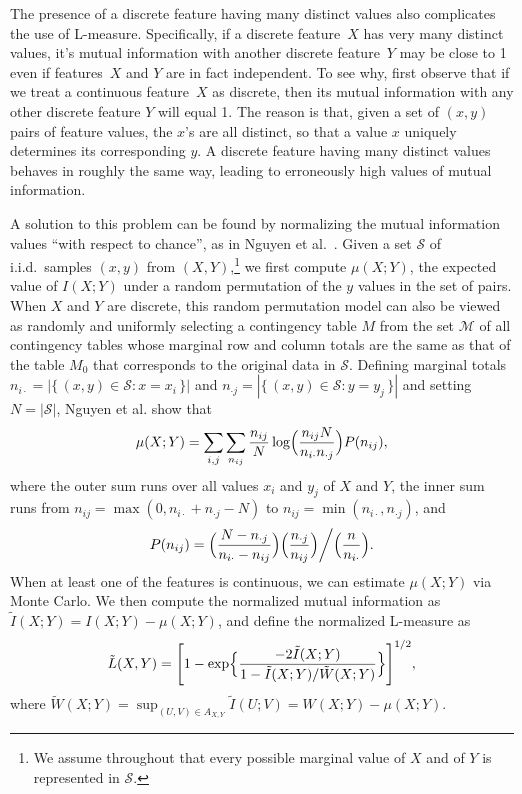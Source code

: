 \documentclass[11pt]{article}
\newcommand{\xM}{\mathcal{M}}
\newcommand{\xS}{\mathcal{S}}
\newcommand{\yI}{\tilde{I}}
\newcommand{\yL}{\tilde{L}}
\newcommand{\yW}{\tilde{W}}
\begin{document}
The presence of a discrete feature having many distinct values also complicates the use of L-measure. Specifically, if a discrete feature~$X$ has very many distinct values, it's mutual information with another discrete feature~$Y$ may be close to 1 even if features~$X$ and $Y$ are in fact independent. To see why, first observe that if we treat a continuous feature~$X$ as discrete, then its mutual information with any other discrete feature $Y$ will equal 1. The reason is that, given a set of $(x,y)$ pairs of feature values, the $x$'s are all distinct, so that a value $x$ uniquely determines its corresponding $y$. A discrete feature having many distinct values behaves in roughly the same way, leading to erroneously high values of mutual information.

A solution to this problem can be found by normalizing the mutual information values ``with respect to chance'', as in Nguyen et al.~\cite{NguyenEB09}. Given a set $\xS$ of i.i.d.\ samples $(x,y)$ from $(X,Y)$,\footnote{We assume throughout that every possible marginal value of $X$ and of $Y$ is represented in $\xS$.} we first compute $\mu(X;Y)$, the expected value of $I(X;Y)$ under a random permutation of the $y$ values in the set of pairs. When $X$ and $Y$ are discrete, this random permutation model can also be viewed as randomly and uniformly selecting a contingency table $M$ from the set $\xM$ of all contingency tables whose marginal row and column totals are the same as that of the table $M_0$ that corresponds to the original data in $\xS$. Defining marginal totals $n_{i\cdot}=|\{\,(x,y)\in\xS:x=x_i\,\}|$ and $n_{\cdot j}=|\{\,(x,y)\in\xS:y=y_j\,\}|$ and setting $N=|\xS|$, Nguyen et al. show that
\begin{equation}\label{eq:muxy}
\mu(X;Y)=\sum_{i,j}\sum_{n_{ij}}\frac{n_{ij}}{N}\log\Bigl(\frac{n_{ij}N}{n_{i\cdot}n_{\cdot j}}\Bigr)P(n_{ij}),
\end{equation}
where the outer sum runs over all values $x_i$ and $y_j$ of $X$ and $Y$, the inner sum runs from $n_{ij}=\max(0,n_{i\cdot}+n_{\cdot j}-N)$ to $n_{ij}=\min(n_{i\cdot},n_{\cdot j})$, and
\[
P(n_{ij})=\Bigl(\frac{N-n_{\cdot j}}{n_{i\cdot}-n_{ij}}\Bigr)\Bigl(\frac{n_{\cdot j}}{n_{ij}}\Bigr)\bigg/\Bigl(\frac{n}{n_{i\cdot}}\Bigr).
\]
When at least one of the features is continuous, we can estimate $\mu(X;Y)$ via Monte Carlo. We then compute the normalized mutual information as $\yI(X;Y)=I(X;Y)-\mu(X;Y)$, and define the normalized L-measure as
\[
\yL(X,Y)=\Biggl[1-\exp\Bigl\{\frac{-2\yI(X;Y)}{1-\yI(X;Y)/\yW(X;Y)}\Bigr\}\Biggr]^{1/2},
\]
where $\yW(X;Y)=\sup_{(U,V)\in A_{X,Y}} \yI(U;V)=W(X;Y)-\mu(X;Y)$.
\end{document}
